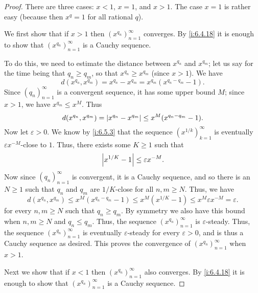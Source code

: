 \begin{proof}
  There are three cases: \(x < 1\), \(x = 1\), and \(x > 1\).
  The case \(x = 1\) is rather easy (because then \(x^q = 1\) for all rational \(q\)).

  We first show that if \(x > 1\) then \((x^{q_n})_{n = 1}^\infty\) converges.
  By \cref{i:6.4.18} it is enough to show that \((x^{q_n})_{n = 1}^\infty\) is a Cauchy sequence.

  To do this, we need to estimate the distance between \(x^{q_n}\) and \(x^{q_m}\);
  let us say for the time being that \(q_n \geq q_m\), so that \(x^{q_n} \geq x^{q_m}\) (since \(x > 1\)).
  We have
  \[
    d(x^{q_n}, x^{q_m}) = x^{q_n} - x^{q_m} = x^{q_m} (x^{q_n - q_m} - 1).
  \]
  Since \((q_n)_{n = 1}^\infty\) is a convergent sequence, it has some upper bound \(M\);
  since \(x > 1\), we have \(x^{q_m} \leq x^M\).
  Thus
  \[
    d(x^{q_n}, x^{q_m}) = \left\lvert x^{q_n} - x^{q_m}\right\rvert \leq x^M (x^{q_n - q_m} - 1).
  \]
  Now let \(\varepsilon > 0\).
  We know by \cref{i:6.5.3} that the sequence \((x^{1 / k})_{k = 1}^\infty\) is eventually \(\varepsilon x^{-M}\)-close to \(1\).
  Thus, there exists some \(K \geq 1\) such that
  \[
    \left\lvert x^{1 / K} - 1\right\rvert \leq \varepsilon x^{-M}.
  \]
  Now since \((q_n)_{n = 1}^\infty\) is convergent, it is a Cauchy sequence, and so there is an \(N \geq 1\) such that \(q_n\) and \(q_m\) are \(1 / K\)-close for all \(n, m \geq N\).
  Thus, we have
  \[
    d(x^{q_n}, x^{q_m}) \leq x^M (x^{q_n - q_m} - 1) \leq x^M (x^{1 / K} - 1) \leq x^M \varepsilon x^{-M} = \varepsilon.
  \]
  for every \(n, m \geq N\) such that \(q_n \geq q_m\).
  By symmetry we also have this bound when \(n, m \geq N\) and \(q_n \leq q_m\).
  Thus, the sequence \((x^{q_n})_{n = 1}^\infty\) is \(\varepsilon\)-steady.
  Thus, the sequence \((x^{q_n})_{n = 1}^\infty\) is eventually \(\varepsilon\)-steady for every \(\varepsilon > 0\), and is thus a Cauchy sequence as desired.
  This proves the convergence of \((x^{q_n})_{n = 1}^\infty\) when \(x > 1\).

  Next we show that if \(x < 1\) then \((x^{q_n})_{n = 1}^\infty\) also converges.
  By \cref{i:6.4.18} it is enough to show that \((x^{q_n})_{n = 1}^\infty\) is a Cauchy sequence.


\end{proof}
